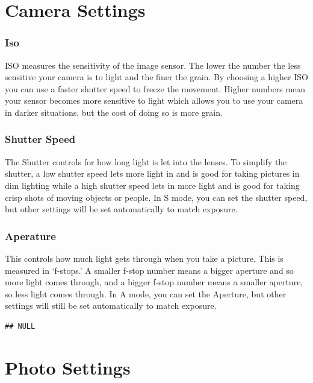 \documentclass[
]{book}
\begin{document}
\hypertarget{camera-settings-1}{%
\chapter{Camera Settings}\label{camera-settings-1}}

\hypertarget{iso}{%
\subsection{Iso}\label{iso}}

ISO measures the sensitivity of the image sensor. The lower the number the less sensitive your camera is to light and the finer the grain. By choosing a higher ISO you can use a faster shutter speed to freeze the movement. Higher numbers mean your sensor becomes more sensitive to light which allows you to use your camera in darker situations, but the cost of doing so is more grain.

\hypertarget{shutter-speed}{%
\subsection{Shutter Speed}\label{shutter-speed}}

The Shutter controls for how long light is let into the lenses. To simplify the shutter, a low shutter speed lets more light in and is good for taking pictures in dim lighting while a high shutter speed lets in more light and is good for taking crisp shots of moving objects or people. In S mode, you can set the shutter speed, but other settings will be set automatically to match exposure.

\hypertarget{aperature}{%
\subsection{Aperature}\label{aperature}}

This controls how much light gets through when you take a picture. This is measured in `f-stops.' A smaller f-stop number means a bigger aperture and so more light comes through, and a bigger f-stop number means a smaller aperture, so less light comes through. In A mode, you can set the Aperture, but other settings will still be set automatically to match exposure.

\begin{verbatim}
## NULL
\end{verbatim}

\hypertarget{photo-settings}{%
\chapter{Photo Settings}\label{photo-settings}}
\end{document}
